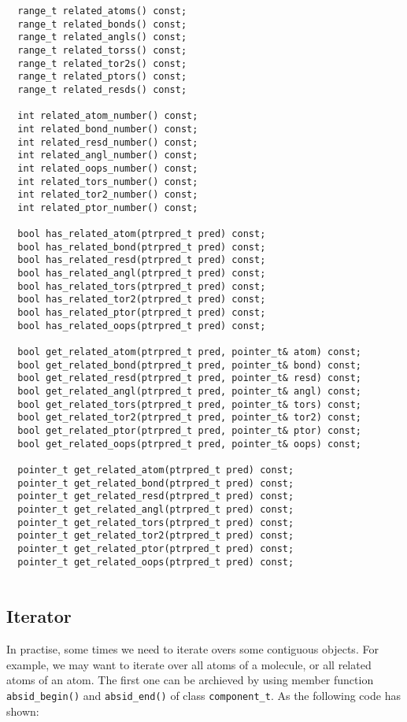 \documentclass[letterpaper]{book}
\begin{document}
\begin{lstlisting}
  range_t related_atoms() const;
  range_t related_bonds() const;
  range_t related_angls() const;
  range_t related_torss() const;
  range_t related_tor2s() const;
  range_t related_ptors() const;
  range_t related_resds() const;

  int related_atom_number() const;
  int related_bond_number() const;
  int related_resd_number() const;
  int related_angl_number() const;
  int related_oops_number() const;
  int related_tors_number() const;
  int related_tor2_number() const;
  int related_ptor_number() const;

  bool has_related_atom(ptrpred_t pred) const;
  bool has_related_bond(ptrpred_t pred) const;
  bool has_related_resd(ptrpred_t pred) const;
  bool has_related_angl(ptrpred_t pred) const;
  bool has_related_tors(ptrpred_t pred) const;
  bool has_related_tor2(ptrpred_t pred) const;
  bool has_related_ptor(ptrpred_t pred) const;
  bool has_related_oops(ptrpred_t pred) const;

  bool get_related_atom(ptrpred_t pred, pointer_t& atom) const;
  bool get_related_bond(ptrpred_t pred, pointer_t& bond) const;
  bool get_related_resd(ptrpred_t pred, pointer_t& resd) const;
  bool get_related_angl(ptrpred_t pred, pointer_t& angl) const;
  bool get_related_tors(ptrpred_t pred, pointer_t& tors) const;
  bool get_related_tor2(ptrpred_t pred, pointer_t& tor2) const;
  bool get_related_ptor(ptrpred_t pred, pointer_t& ptor) const;
  bool get_related_oops(ptrpred_t pred, pointer_t& oops) const;

  pointer_t get_related_atom(ptrpred_t pred) const;
  pointer_t get_related_bond(ptrpred_t pred) const;
  pointer_t get_related_resd(ptrpred_t pred) const;
  pointer_t get_related_angl(ptrpred_t pred) const;
  pointer_t get_related_tors(ptrpred_t pred) const;
  pointer_t get_related_tor2(ptrpred_t pred) const;
  pointer_t get_related_ptor(ptrpred_t pred) const;
  pointer_t get_related_oops(ptrpred_t pred) const;
	
\end{lstlisting}

  


\subsection{Iterator}

  In practise, some times we need to iterate overs some contiguous objects. For example,
we may want to iterate over all atoms of a molecule, or all related atoms of an atom. The first
one can be archieved by using member function \lstinline$absid_begin()$ and \lstinline$absid_end()$
of class \lstinline$component_t$. As the following code has shown:
\end{document}

